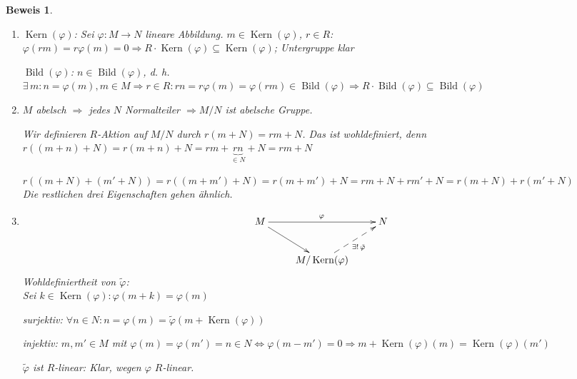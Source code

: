 \documentclass[a4paper,12pt]{scrbook}
\theoremstyle{break}
\theoremstyle{nonumberbreak}
\newtheorem{Bew}{Beweis}
\theoremstyle{nonumberplain}
\DeclareMathOperator{\Kern}{Kern}
\DeclareMathOperator{\Bild}{Bild}
\begin{document}
\begin{Bew}
  \begin{enumerate}
    \item $\Kern(\varphi)$: Sei $\varphi: M \rightarrow N$ lineare Abbildung. $m \in \Kern(\varphi)$, $r \in R$:\\
          $\varphi(rm) = r\varphi(m) = 0 \Rightarrow R \cdot \Kern(\varphi) \subseteq \Kern(\varphi)$; Untergruppe klar

	  $\Bild(\varphi)$: $n \in \Bild(\varphi) $, d. h. $\exists\, m: n = \varphi
   	  (m), m \in M \Rightarrow r \in R:
	  rn = r \varphi(m) = \varphi(rm) \in \Bild(\varphi)  \Rightarrow R
	  \cdot \Bild(\varphi) \subseteq \Bild(\varphi)$
    \item $M$ abelsch $\Rightarrow$ jedes $N$ Normalteiler $\Rightarrow M/N$ ist
          abelsche Gruppe.

    	  Wir definieren $R$-Aktion auf $M/N$ durch $r(m + N) = rm + N$. Das ist 
    	  wohldefiniert, denn\\
	  $r((m+n)+N)=r(m+n) + N= rm + \underbrace{rn}_{\in N} + N = rm + N$

	  $r((m+N) + (m' + N ) ) = r((m+m')+N) = r(m+m') + N = rm + N + rm' + N =
	  r(m+N) + r(m'+N)$\\
	  Die restlichen drei Eigenschaften gehen ähnlich.
	  
    \item
	$$\begin{xy}
              \xymatrix{
                M \ar[rr]^{\varphi} \ar[rd] &     &  N \\
                                            &  M/\Kern(\varphi) \ar@{-->}[ur]_{\exists!\, \tilde{\varphi}}  & }
          \end{xy}$$
	  Wohldefiniertheit von $\tilde{\varphi}$:\\
	  Sei $k \in \Kern(\varphi): \varphi(m+k) = \varphi(m)$

	  surjektiv: $\forall n \in N: n = \varphi(m) = \tilde{\varphi}(m + \Kern(\varphi))$

	  injektiv: $m, m' \in M$ mit $\varphi(m) = \varphi(m') = n \in N \Leftrightarrow 
	  \varphi(m-m') = 0 \Rightarrow m + \Kern(\varphi)(m) = \Kern(\varphi)(m')$

	  $\tilde{\varphi}$ ist $R$-linear: Klar, wegen $\varphi$ $R$-linear.
  \end{enumerate}
\end{Bew}
\end{document}
